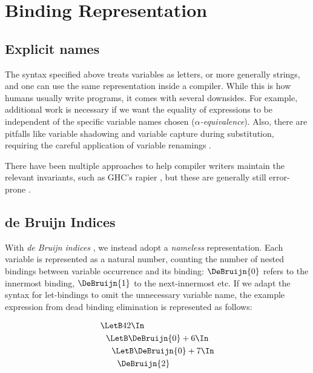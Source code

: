 \chapter{Binding Representation}
\label{ch:binding-representation}

\section{Explicit names}
\label{sec:binding-representation-names}
The syntax specified above treats variables as letters, or more generally strings,
and one can use the same representation inside a compiler.
While this is how humans usually write programs, it comes with several downsides.
For example, additional work is necessary
if we want the equality of expressions to be independent of the specific variable names chosen
(\emph{$\alpha$-equivalence}).
Also, there are pitfalls like variable shadowing and variable capture during substitution,
requiring the careful application of variable renamings
\cite{Barendregt1985LambdaCalculus}.

There have been multiple approaches to help compiler writers maintain the relevant invariants,
such as GHC's rapier \cite{Jones2002GHCInliner},
but these are generally still error-prone
\cite{Maclaurin2022Foil}.

\section{de Bruijn Indices}
\label{sec:binding-representation-de-bruijn}

With \emph{de Bruijn indices}
\cite{DeBruijn1972NamelessIndices},
we instead adopt a \emph{nameless} representation.
Each variable is represented as a natural number,
counting the number of nested bindings between variable occurrence and its binding:
$\DeBruijn{0}$ refers to the innermost binding, $\DeBruijn{1}$ to the next-innermost etc.
If we adapt the syntax for let-bindings to omit the unnecessary variable name,
the example expression from dead binding elimination is represented as follows:

\begin{align*}
  &\LetB 42 \In                       \\
  &\ \ \LetB \DeBruijn{0} + 6 \In     \\
  &\ \ \ \ \LetB \DeBruijn{0} + 7 \In \\
  &\ \ \ \ \ \ \DeBruijn{2}
\end{align*}

